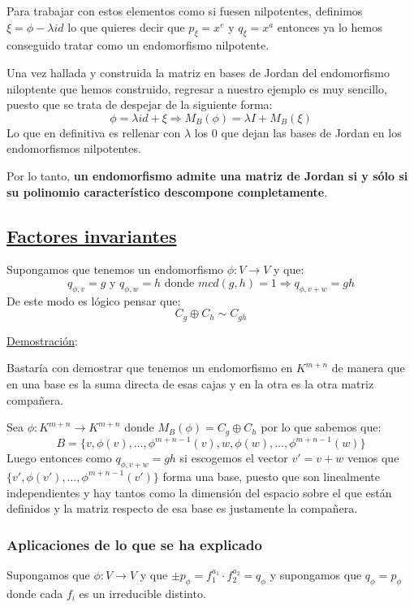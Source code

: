\documentclass[10pt,a4paper,openright]{book}
\begin{document}
Para trabajar con estos elementos como si fuesen nilpotentes, definimos $\xi = \phi- \lambda id$ lo que quieres decir que $p_\xi = x^e$ y $q_\xi = x^a$ entonces ya lo hemos conseguido tratar como un endomorfismo nilpotente.

Una vez hallada y construida la matriz en bases de Jordan del endomorfismo niloptente que hemos construido, regresar a nuestro ejemplo es muy sencillo, puesto que se trata de despejar de la siguiente forma:
$$\phi = \lambda id +\xi\Rightarrow M_B(\phi)=\lambda I +M_B(\xi)$$ 
Lo que en definitiva es rellenar con $\lambda$ los $0$ que dejan las bases de Jordan en los endomorfismos nilpotentes.

Por lo tanto, \textbf{un endomorfismo admite una matriz de Jordan si y sólo si su polinomio característico descompone completamente}.

\subsection*{\underline{Factores invariantes}}
Supongamos que tenemos un endomorfismo $\phi:V\rightarrow V$ y que:
$$q_{\phi,v} = g\mbox{ y }q_{\phi, w} = h\mbox{ donde }mcd(g,h)=1\Rightarrow q_{\phi, v+w}=gh$$
De este modo es lógico pensar que:
$$C_{g}\oplus C_{h} \sim C_{gh}$$

\underline{Demostración}:

Bastaría con demostrar que tenemos un endomorfismo en $K^{m+n}$ de manera que en una base es la suma directa de esas cajas y en la otra es la otra matriz compañera.

Sea $\phi: K^{m+n}\rightarrow K^{m+n}$ donde $M_B(\phi) = C_{g}\oplus C_{h}$ por lo que sabemos que:
$$B=\{v, \phi(v), \ldots, \phi^{m+n-1}(v), w, \phi(w), \ldots, \phi^{m+n-1}(w)\}$$
Luego entonces como $q_{\phi, v+w}=gh$ si escogemos el vector $v'=v+w$ vemos que $\{v', \phi(v'), \ldots, \phi^{m+n-1}(v')\}$ forma una base, puesto que son linealmente independientes y hay tantos como la dimensión del espacio sobre el que están definidos y la matriz respecto de esa base es justamente la compañera.

\subsubsection{Aplicaciones de lo que se ha explicado}
Supongamos que $\phi: V\rightarrow V$ y que $\pm p_\phi = f_1^{a_1}\cdot f_2^{a_2} = q_\phi$ y supongamos que $q_\phi=p_\phi$ donde cada $f_i$ es un irreducible distinto.
\end{document}
